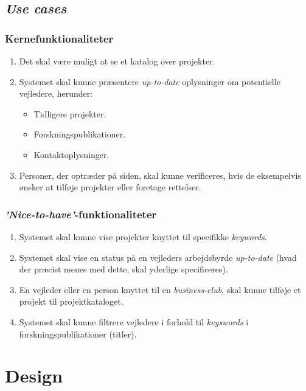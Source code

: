 \documentclass[12pt]{article}
\begin{document}
\subsection*{\textit{Use cases}}

\subsubsection{Kernefunktionaliteter}
\label{sec:corefuncs}
\begin{enumerate}
	\item Det skal være muligt at se et katalog over projekter.
	\item Systemet skal kunne præsentere \textit{up-to-date} oplysninger om potentielle vejledere, herunder:
	\begin{itemize}
		\item Tidligere projekter.
		\item Forskningspublikationer.
		\item Kontaktoplysninger.
	\end{itemize}
	\item Personer, der optræder på siden, skal kunne verificeres, hvis de eksempelvis ønsker at tilføje projekter eller foretage rettelser.
\end{enumerate}

\subsubsection*{\textit{'Nice-to-have'}-funktionaliteter}
\label{sec:nicefuncs}
\begin{enumerate}
  \item Systemet skal kunne vise projekter knyttet til specifikke \textit{keywords}.

  \item Systemet skal vise en status på en vejleders arbejdsbyrde \textit{up-to-date} (hvad der præcist menes med dette, skal yderlige specificeres).
  \item En vejleder eller en person knyttet til en \textit{business-club}, skal kunne tilføje et projekt til projektkataloget.

	\item Systemet skal kunne filtrere vejledere i forhold til \textit{keyswords} i forskningspublikationer (titler).
\end{enumerate}


\section{Design}
\label{sec:design}
\end{document}
